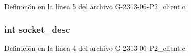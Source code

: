 Definición en la línea 5 del archivo G-\/2313-\/06-\/\+P2\+\_\+client.\+c.

\subsubsection[{\texorpdfstring{socket\+\_\+desc}{socket_desc}}]{\setlength{\rightskip}{0pt plus 5cm}int socket\+\_\+desc}\hypertarget{G-2313-06-P2__client__function__handlers_8c_adeadf7cb6916a10c7142ce7d265ab32a}{}\label{G-2313-06-P2__client__function__handlers_8c_adeadf7cb6916a10c7142ce7d265ab32a}


Definición en la línea 4 del archivo G-\/2313-\/06-\/\+P2\+\_\+client.\+c.

